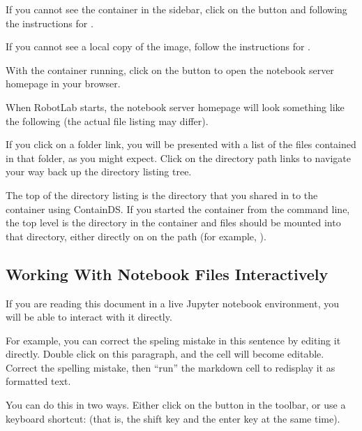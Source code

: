 \documentclass[letterpaper,10pt,english]{sphinxmanual}
\let\sphinxpxdimen\pdfpxdimen\else\newdimen\sphinxpxdimen
\begin{document}
If you cannot see the container in the sidebar, click on the  button and following the instructions for .

If you cannot see a local copy of the image, follow the instructions for .

With the container running, click on the  button to open the notebook server homepage in your browser.

When RobotLab starts, the notebook server homepage will look something like the following (the actual file listing may differ).

\sphinxincludegraphics[width=2160\sphinxpxdimen,height=564\sphinxpxdimen]{{00_01_jupyter_nb_homepage}.png}

If you click on a folder link, you will be presented with a list of the files contained in that folder, as you might expect. Click on the directory path links to navigate your way back up the directory listing tree.

The top of the directory listing is the directory that you shared in to the container using ContainDS. If you started the container from the command line, the top level is the  directory in the container and files should be mounted into that directory, either directly on on the path (for example, ).


\subsection{Working With Notebook Files Interactively}
\label{\detokenize{content/00_READ_ME_FIRST/Section_00_06_RoboLab_Environment:Working-With-Notebook-Files-Interactively}}
If you are reading this document in a live Jupyter notebook environment, you will be able to interact with it directly.

For example, you can correct the speling mistake in this sentence by editing it directly. Double click on this paragraph, and the cell will become editable. Correct the spelling mistake, then “run” the markdown cell to redisplay it as formatted text.

You can do this in two ways. Either click on the  button in the toolbar, or use a keyboard shortcut:  (that is, the shift key and the enter key at the same time).
\end{document}
